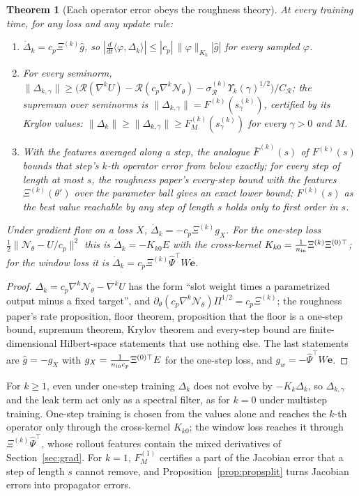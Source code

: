 \documentclass[11pt]{article}
\newtheorem{theorem}{Theorem}
\theoremstyle{definition}
\theoremstyle{remark}
\newcommand{\ee}{\mathbf{e}}
\newcommand{\Rgh}{\mathcal{R}}
\newcommand{\Psih}{\hat\Psi}
\newcommand{\Nn}{\mathcal N_\theta}
\begin{document}
\begin{theorem}[Each operator error obeys the roughness theory]\label{thm:operators}
At every training time, for any loss and any update rule:
\begin{enumerate}
\item $\dot\Delta_k=c_p\Xi^{(k)}\hat g$, so $|\tfrac{d}{dt}\langle\varphi,\Delta_k\rangle|\le|c_p|\,\|\varphi\|_{K_k}|\hat g|$ for every sampled $\varphi$.
\item For every seminorm, $\|\Delta_{k,\gamma}\|\ge\big(\Rgh(\nabla^kU)-\Rgh(c_p\nabla^k\Nn)-\sigma^{(k)}_\Rgh\Upsilon_k(\gamma)^{1/2}\big)/C_\Rgh$; the supremum over seminorms is $\|\Delta_{k,\gamma}\|=F^{(k)}(s^{(k)}_\gamma)$, certified by its Krylov values: $\|\Delta_k\|\ge\|\Delta_{k,\gamma}\|\ge F^{(k)}_M(s^{(k)}_\gamma)$ for every $\gamma>0$ and $M$.
\item With the features averaged along a step, the analogue $\bar F^{(k)}(s)$ of $F^{(k)}(s)$ bounds that step's $k$-th operator error from below exactly; for every step of length at most $s$, the roughness paper's every-step bound with the features $\Xi^{(k)}(\theta')$ over the parameter ball gives an exact lower bound; $F^{(k)}(s)$ as the best value reachable by any step of length $s$ holds only to first order in $s$.
\end{enumerate}
Under gradient flow on a loss $X$, $\dot\Delta_k=-c_p\Xi^{(k)}g_X$. For the one-step loss $\tfrac12\|\Nn-U/c_p\|^2$ this is $\dot\Delta_k=-K_{k0}E$ with the cross-kernel $K_{k0}=\frac1{n_{\rm in}}\Xi^{(k)}\Xi^{(0)\top}$; for the window loss it is $\dot\Delta_k=c_p\Xi^{(k)}\Psih^\top W\ee$.
\end{theorem}

\begin{proof}
$\Delta_k=c_p\nabla^k\Nn-\nabla^kU$ has the form ``slot weight times a parametrized output minus a fixed target'', and $\partial_\theta(c_p\nabla^k\Nn)\Pi^{1/2}=c_p\Xi^{(k)}$; the roughness paper's rate proposition, floor theorem, proposition that the floor is a one-step bound, supremum theorem, Krylov theorem and every-step bound are finite-dimensional Hilbert-space statements that use nothing else.
The last statements are $\hat g=-g_X$ with $g_X=\frac1{n_{\rm in}c_p}\Xi^{(0)\top}E$ for the one-step loss, and $g_w=-\Psih^\top W\ee$.
\end{proof}

For $k\ge1$, even under one-step training $\Delta_k$ does not evolve by $-K_k\Delta_k$, so $\Delta_{k,\gamma}$ and the leak term act only as a spectral filter, as for $k=0$ under multistep training.
One-step training is chosen from the values alone and reaches the $k$-th operator only through the cross-kernel $K_{k0}$; the window loss reaches it through $\Xi^{(k)}\Psih^\top$, whose rollout features contain the mixed derivatives of Section~\ref{sec:grad}.
For $k=1$, $F^{(1)}_M$ certifies a part of the Jacobian error that a step of length $s$ cannot remove, and Proposition~\ref{prop:propsplit} turns Jacobian errors into propagator errors.
\end{document}
